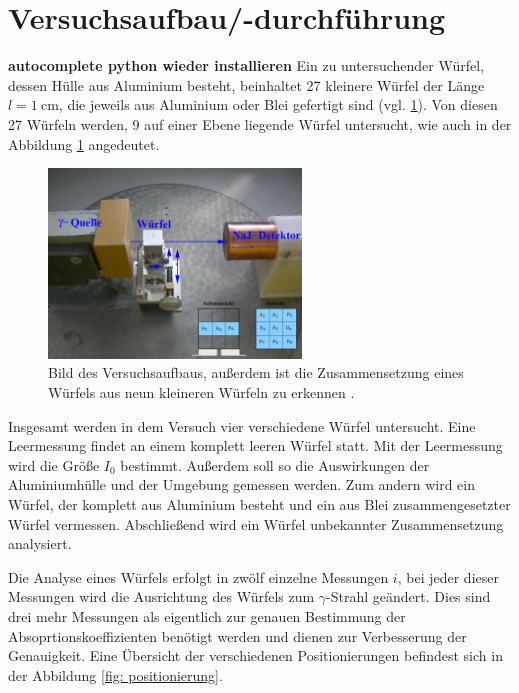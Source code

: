 \section{Versuchsaufbau/-durchführung}
\textbf{autocomplete python wieder installieren}
Ein zu untersuchender Würfel, dessen Hülle aus Aluminium besteht, beinhaltet 27 kleinere Würfel der Länge $l=\SI{1}{\centi\meter}$,
die jeweils aus Aluminium oder Blei gefertigt sind (vgl. \ref{fig: aufbau}).
Von diesen 27 Würfeln werden, 9 auf einer Ebene liegende Würfel untersucht, wie auch in der Abbildung \ref{fig: aufbau} angedeutet.

\begin{figure}[h]
  \centering
  \includegraphics[width=0.6\textwidth]{pics/Aufbau.pdf}
  \caption{Bild des Versuchsaufbaus, außerdem ist die Zusammensetzung eines Würfels aus neun kleineren Würfeln zu erkennen \cite{anleitungb14}.}
  \label{fig: aufbau}
\end{figure}

Insgesamt werden in dem Versuch vier verschiedene Würfel untersucht. Eine Leermessung findet an
einem komplett leeren Würfel statt. Mit der Leermessung wird die Größe $I_0$ bestimmt.
Außerdem soll so die Auswirkungen der Aluminiumhülle und der Umgebung gemessen werden.
Zum andern wird ein Würfel, der komplett aus Aluminium besteht und
ein aus Blei zusammengesetzter Würfel vermessen. Abschließend wird ein Würfel
unbekannter Zusammensetzung analysiert.

Die Analyse eines Würfels erfolgt in zwölf einzelne Messungen $i$,
bei jeder dieser Messungen wird die Ausrichtung des Würfels zum $\gamma$-Strahl geändert.
Dies sind drei mehr Messungen als eigentlich zur genauen Bestimmung der Absoprtionskoeffizienten
benötigt werden und dienen zur Verbesserung der Genauigkeit.
Eine Übersicht der verschiedenen Positionierungen befindest sich in der Abbildung \ref{fig: positionierung}.

